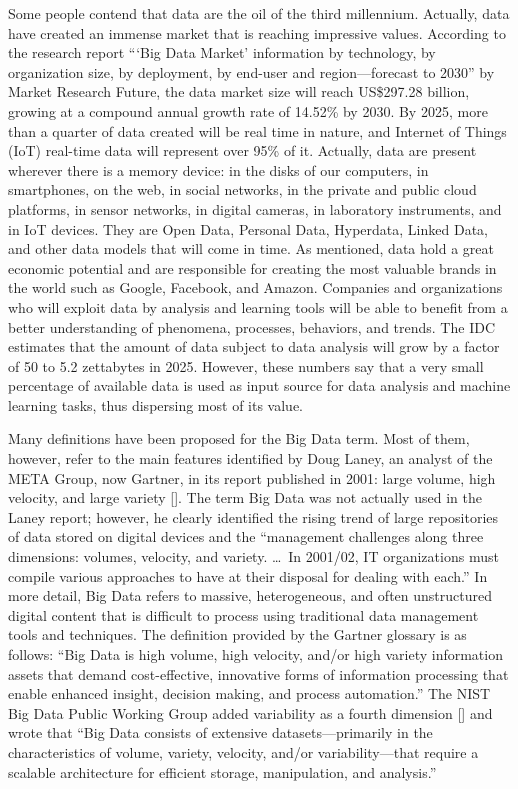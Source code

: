 Some people contend that data are the oil of the third millennium. Actually, data have created an immense market that is reaching impressive values. According to the research report ``{`Big Data Market'} information by technology, by organization size, by deployment, by end-user and region---forecast to 2030'' by Market Research Future, the data market size will reach US\$297.28 billion, growing at a compound annual growth rate of 14.52\% by 2030. By 2025, more than a quarter of data created will be real time in nature, and Internet of Things (IoT) real-time data will represent over 95\% of it. Actually, data are present wherever there is a memory device: in the disks of our computers, in smartphones, on the web, in social networks, in the private and public cloud platforms, in sensor networks, in digital cameras, in laboratory instruments, and in IoT devices. They are Open Data, Personal Data, Hyperdata, Linked Data, and other data models that will come in time. As mentioned, data hold a great economic potential and are responsible for creating the most valuable brands in the world such as Google, Facebook, and Amazon. Companies and organizations who will exploit data by analysis and learning tools will be able to benefit from a better understanding of phenomena, processes, behaviors, and trends. The IDC estimates that the amount of data subject to data analysis will grow by a factor of 50 to 5.2 zettabytes in 2025. However, these numbers say that a very small percentage of available data is used as input source for data analysis and machine learning tasks, thus dispersing most of its value.

Many definitions have been proposed for the Big Data term. Most of them, however, refer to the main features identified by Doug Laney, an analyst of the META Group, now Gartner, in its report published in 2001: large volume, high velocity, and large variety [\citealt{chap:3:Laney:2001}]. The term Big Data was not actually used in the Laney report; however, he clearly identified the rising trend of large repositories of data stored on digital devices and the ``management challenges along three dimensions: volumes, velocity, and variety. \dots\ In 2001/02, IT organizations must compile various approaches to have at their disposal for dealing with each.'' In more detail, Big Data refers to massive, heterogeneous, and often unstructured digital content that is difficult to process using traditional data management tools and techniques. The definition provided by the Gartner glossary is as follows: ``Big Data is high volume, high velocity, and/or high variety information assets that demand cost-effective, innovative forms of information processing that enable enhanced insight, decision making, and process automation.'' The NIST Big Data Public Working Group added variability as a fourth dimension [\citealt{chap:3:NIST:2015}] and wrote that ``Big Data consists of extensive datasets---primarily in the characteristics of volume, variety, velocity, and/or variability---that require a scalable architecture for efficient storage, manipulation, and analysis.''

